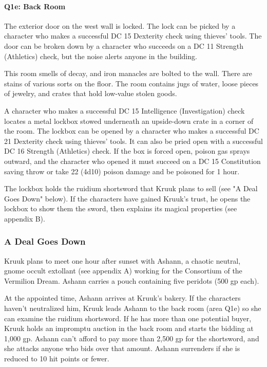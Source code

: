 \documentclass[10pt,a4paper,twoside,bg=print,twocolumn,openany,nodeprecatedcode]{dndbook}
\begin{document}
\paragraph{Q1e: Back Room}
The exterior door on the west wall is locked. The lock can be picked by a character who makes a successful DC 15 Dexterity check using thieves' tools. The door can be broken down by a character who succeeds on a DC 11 Strength (Athletics) check, but the noise alerts anyone in the building.

This room smells of decay, and iron manacles are bolted to the wall. There are stains of various sorts on the floor. The room contains jugs of water, loose pieces of jewelry, and crates that hold low-value stolen goods.

A character who makes a successful DC 15 Intelligence (Investigation) check locates a metal lockbox stowed underneath an upside-down crate in a corner of the room. The lockbox can be opened by a character who makes a successful DC 21 Dexterity check using thieves' tools. It can also be pried open with a successful DC 16 Strength (Athletics) check. If the box is forced open, poison gas sprays outward, and the character who opened it must succeed on a DC 15 Constitution saving throw or take 22 (4d10) poison damage and be poisoned for 1 hour.

The lockbox holds the ruidium shortsword that Kruuk plans to sell (see "A Deal Goes Down" below). If the characters have gained Kruuk's trust, he opens the lockbox to show them the sword, then explains its magical properties (see appendix B).

\subsubsection{A Deal Goes Down}
Kruuk plans to meet one hour after sunset with Ashann, a chaotic neutral, gnome occult extollant (see appendix A) working for the Consortium of the Vermilion Dream. Ashann carries a pouch containing five peridots (500 gp each).

At the appointed time, Ashann arrives at Kruuk's bakery. If the characters haven't neutralized him, Kruuk leads Ashann to the back room (area Q1e) so she can examine the ruidium shortsword. If he has more than one potential buyer, Kruuk holds an impromptu auction in the back room and starts the bidding at 1,000 gp. Ashann can't afford to pay more than 2,500 gp for the shortsword, and she attacks anyone who bids over that amount. Ashann surrenders if she is reduced to 10 hit points or fewer.
\end{document}
